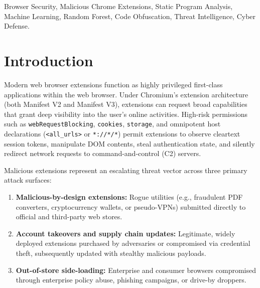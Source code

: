 \documentclass[conference]{IEEEtran}
\begin{document}
\begin{IEEEkeywords}
Browser Security, Malicious Chrome Extensions, Static Program Analysis, Machine Learning, Random Forest, Code Obfuscation, Threat Intelligence, Cyber Defense.
\end{IEEEkeywords}

\section{Introduction}
Modern web browser extensions function as highly privileged first-class applications within the web browser. Under Chromium's extension architecture (both Manifest V2 and Manifest V3), extensions can request broad capabilities that grant deep visibility into the user's online activities. High-risk permissions such as \texttt{webRequestBlocking}, \texttt{cookies}, \texttt{storage}, and omnipotent host declarations (\texttt{<all\_urls>} or \texttt{*://*/*}) permit extensions to observe cleartext session tokens, manipulate DOM contents, steal authentication state, and silently redirect network requests to command-and-control (C2) servers.

Malicious extensions represent an escalating threat vector across three primary attack surfaces:
\begin{enumerate}
    \item \textbf{Malicious-by-design extensions:} Rogue utilities (e.g., fraudulent PDF converters, cryptocurrency wallets, or pseudo-VPNs) submitted directly to official and third-party web stores.
    \item \textbf{Account takeovers and supply chain updates:} Legitimate, widely deployed extensions purchased by adversaries or compromised via credential theft, subsequently updated with stealthy malicious payloads.
    \item \textbf{Out-of-store side-loading:} Enterprise and consumer browsers compromised through enterprise policy abuse, phishing campaigns, or drive-by droppers.
\end{enumerate}
\end{document}
